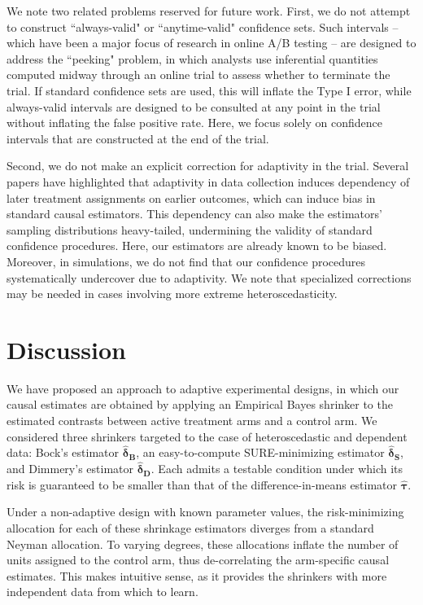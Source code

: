 \documentclass{article}
\newcommand{\hbstau}{\boldsymbol{\hat \tau}}
\newcommand{\bsdeltad}{\boldsymbol{\hat \delta_{\textbf{D}}}}
\newcommand{\bsdeltb}{\boldsymbol {\hat \delta_B}}
\newcommand{\bsdelts}{\boldsymbol {\hat \delta_S}}
\begin{document}
We note two related problems reserved for future work. First, we do not attempt to construct ``always-valid" or ``anytime-valid" confidence sets. Such intervals -- which have been a major focus of research in online A/B testing \citep[see e.g.][]{Johari2017, johari2022always, maharaj2023anytime} -- are designed to address the ``peeking" problem, in which analysts use inferential quantities computed midway through an online trial to assess whether to terminate the trial. If standard confidence sets are used, this will inflate the Type I error, while always-valid intervals are designed to be consulted at any point in the trial without inflating the false positive rate. Here, we focus solely on confidence intervals that are constructed at the end of the trial. 

Second, we do not make an explicit correction for adaptivity in the trial. Several papers \citep{hadad2021confidence, zhao2023adaptive} have highlighted that adaptivity in data collection induces dependency of later treatment assignments on earlier outcomes, which can induce bias in standard causal estimators. This dependency can also make the estimators' sampling distributions heavy-tailed, undermining the validity of standard confidence procedures. Here, our estimators are already known to be biased. Moreover, in simulations, we do not find that our confidence procedures systematically undercover due to adaptivity. We note that specialized corrections may be needed in cases involving more extreme heteroscedasticity.%




\section{Discussion}\label{sec:conclusion}

We have proposed an approach to adaptive experimental designs, in which our causal estimates are obtained by applying an Empirical Bayes shrinker to the estimated contrasts between active treatment arms and a control arm. We considered three shrinkers targeted to the case of heteroscedastic and dependent data: Bock's estimator $\bsdeltb$, an easy-to-compute SURE-minimizing estimator $\bsdelts$, and Dimmery's estimator $\bsdeltad$. Each admits a testable condition under which its risk is guaranteed to be smaller than that of the difference-in-means estimator $\hbstau$.  

Under a non-adaptive design with known parameter values, the risk-minimizing allocation for each of these shrinkage estimators diverges from a standard Neyman allocation. To varying degrees, these allocations inflate the number of units assigned to the control arm, thus de-correlating the arm-specific causal estimates. This makes intuitive sense, as it provides the shrinkers with more independent data from which to learn. 
\end{document}
